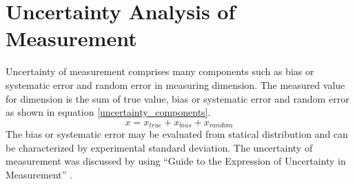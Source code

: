 \documentclass[12pt,oneside]{jbook}
\begin{document}
\clearpage
\section{Uncertainty Analysis of Measurement}
Uncertainty of measurement comprises many components such as bias or systematic error and random error in measuring dimension.
The measured value for dimension is the sum of true value, bias or systematic error and random error as shown in equation \ref{uncertainty_components}.
\begin{equation}
    x = x_{true}+x_{bias}+x_{random}
    \label{uncertainty_components}
\end{equation}
The bias or systematic error may be evaluated from statical distribution and can be characterized by experimental standard deviation.
The uncertainty of measurement was discussed by using ``Guide to the Expression of Uncertainty in Measurement'' \cite{jcgm2008}.
\end{document}

